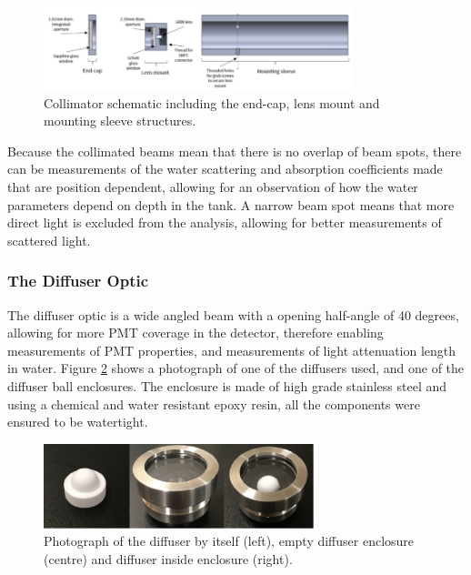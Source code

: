 \begin{figure}
    \centering
    \includegraphics[width=0.8\textwidth]{Figures/collimator_schematic.png}
    \caption{Collimator schematic including the end-cap, lens mount and mounting sleeve structures.}
    \label{fig:collimator_schematic}
\end{figure}

 Because the collimated beams mean that there is no overlap of beam spots, there can be measurements of the water scattering and absorption coefficients made that are position dependent, allowing for an observation of how the water parameters depend on depth in the tank. A narrow beam spot means that more direct light is excluded from the analysis, allowing for better measurements of scattered light.

\subsubsection{The Diffuser Optic}

The diffuser optic is a wide angled beam with a opening half-angle of 40 degrees, allowing for more PMT coverage in the detector, therefore enabling measurements of PMT properties, and measurements of light attenuation length in water. Figure \ref{fig:diffuser_photo} shows a photograph of one of the diffusers used, and one of the diffuser ball enclosures. The enclosure is made of high grade stainless steel and using a chemical and water resistant epoxy resin, all the components were ensured to be watertight. 

\begin{figure}
    \centering
    \includegraphics[width=0.7\textwidth]{Figures/diffuser_photo.png}
    \caption{Photograph of the diffuser by itself (left), empty diffuser enclosure (centre) and diffuser inside enclosure (right).}
    \label{fig:diffuser_photo}
\end{figure} 

